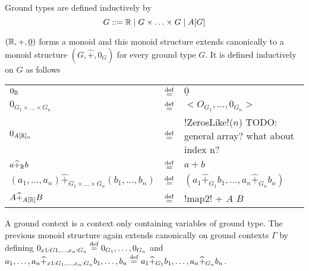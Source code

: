 Ground types are defined inductively by 
$$G::= \mathbb{R} \mid G\times \ldots \times G \mid A[G]$$

$(\mathbb{R},+,\underline{0})$ forms a monoid and this monoid structure extends canonically 
to a monoid structure $(G,\widehat{+},0_G)$ for every ground type $G$. 
It is defined inductively on $G$ as follows

\begin{tabular}{l c l}
    $0_{\mathbb{R}}$  & $\stackrel {\mathrm{def}}=$ & $\underline{0}$ \\
    $0_{G_1\times \ldots \times G_n}$ & $\stackrel {\mathrm{def}}=$ &  $< O_{G_1},\ldots, 0_{G_n} >$ \\
    $0_{A[\mathbb{R}]_n}$& $\stackrel {\mathrm{def}}=$ & !ZerosLike!($n$) TODO: general array? what about index n? \\
    $a\widehat{+}_{\mathbb{R}} b$ & $\stackrel {\mathrm{def}}=$ & $ a+b$ \\
    $(a_1,\ldots,a_n)\widehat{+}_{G_1\times\ldots\times G_n}(b_1,\ldots,b_n)$ & $\stackrel {\mathrm{def}}=$ & $(a_1\widehat{+}_{G_1}b_1,\ldots,a_n\widehat{+}_{G_n}b_n)$ \\
    $A\widehat{+}_{A[\mathbb{R}]}B $ & $\stackrel {\mathrm{def}}=$ & !map2! + $A$ $B$ 
\end{tabular}

A ground context is a context only containing variables of ground type.
The previous monoid structure again extends canonically on ground contexts $\Gamma$ by defining
$0_{x1:G1,\ldots,x_n:G_n}\stackrel {\mathrm{def}}= 0_{G_1},\ldots,0_{G_n}$ and 
$a_1,\ldots,a_n\widehat{+}_{x1:G_1,\ldots, x_n:G_n}b_1,\ldots,b_n\stackrel {\mathrm{def}}= a_1\widehat{+}_{G_1}b_1,\ldots,a_n\widehat{+}_{G_n}b_n$.


